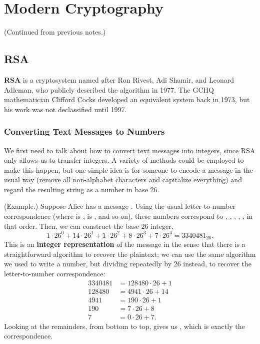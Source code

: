 \documentclass[letterpaper]{article}
\begin{document}
\section{Modern Cryptography}
(Continued from previous notes.)

\subsection{RSA}
\textbf{RSA} is a cryptosystem named after Ron Rivest, Adi Shamir, and Leonard Adleman, who publicly described the algorithm in 1977. The GCHQ mathematician Clifford Cocks developed an equivalent system back in 1973, but his work was not declassified until 1997.

\subsubsection{Converting Text Messages to Numbers}
We first need to talk about how to convert text messages into integers, since RSA only allows us to transfer integers. A variety of methods could be employed to make this happen, but one simple idea is for someone to encode a message in the usual way (remove all non-alphabet characters and capitalize everything) and regard the resulting string as a number in base 26. 

\begin{mdframed}
    (Example.) Suppose Alice has a message . Using the usual letter-to-number correspondence (where  is ,  is , and so on), these numbers correspond to , , , , , in that order. Then, we can construct the base 26 integer, \[1 \cdot 26^0 + 14 \cdot 26^1 + 1 \cdot 26^2 + 8 \cdot 26^3 + 7 \cdot 26^4 = 3340481_{26}.\]
    This is an \textbf{integer representation} of the message  in the sense that there is a straightforward algorithm to recover the plaintext; we can use the same algorithm we used to write a number, but dividing repeatedly by 26 instead, to recover the letter-to-number correspondence: 
    \begin{equation*}
        \begin{aligned}
            3340481 &= 128480 \cdot 26 + 1 \\ 
            128480 &= 4941 \cdot 26 + 14 \\ 
            4941 &= 190 \cdot 26 + 1 \\ 
            190 &= 7 \cdot 26 + 8 \\ 
            7 &= 0 \cdot 26 + 7.
        \end{aligned}
    \end{equation*}
    Looking at the remainders, from bottom to top, gives us , which is exactly the correspondence.
\end{mdframed}
\end{document}
